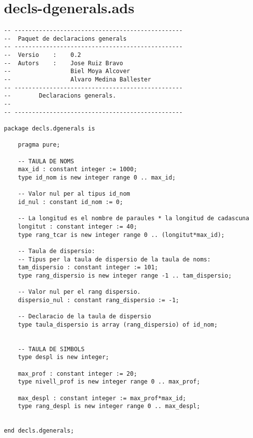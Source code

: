 \documentclass[10pt]{report}
\begin{document}
    \section{decls-dgenerals.ads}
    \begin{lstlisting}[style=Ada]
-- ------------------------------------------------
--  Paquet de declaracions generals
-- ------------------------------------------------
--  Versio    :    0.2
--  Autors    :    Jose Ruiz Bravo
--                 Biel Moya Alcover
--                 Alvaro Medina Ballester
-- ------------------------------------------------
--        Declaracions generals.
--
-- ------------------------------------------------

package decls.dgenerals is

    pragma pure;

    -- TAULA DE NOMS
    max_id : constant integer := 1000;
    type id_nom is new integer range 0 .. max_id;
    
    -- Valor nul per al tipus id_nom
    id_nul : constant id_nom := 0;
        
    -- La longitud es el nombre de paraules * la longitud de cadascuna
    longitut : constant integer := 40;
    type rang_tcar is new integer range 0 .. (longitut*max_id);
    
    -- Taula de dispersio:
    -- Tipus per la taula de dispersio de la taula de noms:
    tam_dispersio : constant integer := 101;
    type rang_dispersio is new integer range -1 .. tam_dispersio;
    
    -- Valor nul per el rang dispersio.
    dispersio_nul : constant rang_dispersio := -1;
    
    -- Declaracio de la taula de dispersio
    type taula_dispersio is array (rang_dispersio) of id_nom;
    
    
    -- TAULA DE SIMBOLS
    type despl is new integer;
    
    max_prof : constant integer := 20;
    type nivell_prof is new integer range 0 .. max_prof;
    
    max_despl : constant integer := max_prof*max_id;
    type rang_despl is new integer range 0 .. max_despl;
    

end decls.dgenerals;
    \end{lstlisting}
    \newpage
        
\end{document}
